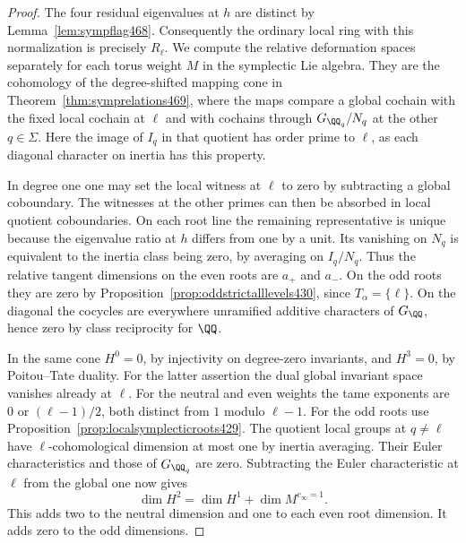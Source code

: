 \documentclass[a4paper,11pt]{article}
\theoremstyle{definition}
\theoremstyle{remark}
\numberwithin{equation}{section}
\begin{document}
\begin{proof}
The four residual eigenvalues at \(h\) are distinct by
Lemma~\ref{lem:sympflag468}. Consequently the ordinary local ring
with this normalization is precisely \(R_\ell\). We compute the
relative deformation spaces separately for each torus weight \(M\)
in the symplectic Lie algebra. They are the cohomology of the
degree-shifted mapping cone in Theorem~\ref{thm:symprelations469},
where the maps compare a global cochain with the fixed local
cochain at \(\ell\) and with cochains through \(G_{\QQ_q}/N_q\)
at the other \(q\in\Sigma\). Here the image of \(I_q\) in that
quotient has order prime to \(\ell\), as each diagonal character
on inertia has this property.

In degree one one may set the local witness at \(\ell\) to zero
by subtracting a global coboundary. The witnesses at the other
primes can then be absorbed in local quotient coboundaries. On
each root line the remaining representative is unique because
the eigenvalue ratio at \(h\) differs from one by a unit. Its
vanishing on \(N_q\) is equivalent to the inertia class being zero,
by averaging on \(I_q/N_q\). Thus the relative tangent dimensions
on the even roots are \(a_+\) and \(a_-\). On the odd roots they
are zero by Proposition~\ref{prop:oddstrictalllevels430}, since
\(T_\alpha=\{\ell\}\). On the diagonal the cocycles are everywhere
unramified additive characters of \(G_\QQ\), hence zero by class
reciprocity for \(\QQ\).

In the same cone \(H^0=0\), by injectivity on degree-zero
invariants, and \(H^3=0\), by Poitou--Tate duality. For the
latter assertion the dual global invariant space vanishes already
at \(\ell\). For the neutral and even weights the tame exponents
are \(0\) or \((\ell-1)/2\), both distinct from \(1\) modulo
\(\ell-1\). For the odd roots use
Proposition~\ref{prop:localsymplecticroots429}. The quotient local
groups at \(q\ne\ell\) have \(\ell\)-cohomological dimension at
most one by inertia averaging. Their Euler characteristics and
those of \(G_{\QQ_q}\) are zero. Subtracting the Euler characteristic
at \(\ell\) from the global one now gives
\[
       \dim H^2=\dim H^1+\dim M^{c_\infty=1}.
\]
This adds two to the neutral dimension and one to each even root
dimension. It adds zero to the odd dimensions.


\end{proof}
\end{document}
